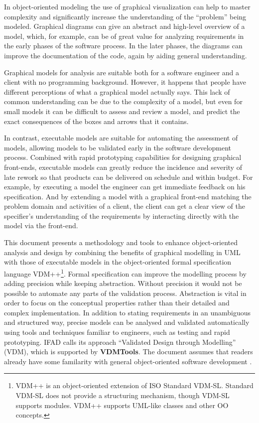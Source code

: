 \documentclass[\pformat,12pt,twoside]{article}
\newcommand{\vdmtools}{\textbf{VDMTools}}
\begin{document}
In object-oriented modeling the use of graphical visualization 
can help to master complexity and significantly increase the 
understanding of the ``problem'' being modeled. Graphical diagrams 
can give an abstract and high-level overview of a model, which, 
for example, can be of great value for analyzing requirements 
in the early phases of the software process. In the later phases, 
the diagrams can improve the documentation of the code, again 
by aiding general understanding.

Graphical models for analysis are suitable both for a software 
engineer and a client with no programming background. However, 
it happens that people have different perceptions of what a graphical 
model actually says. This lack of common understanding can be 
due to the complexity of a model, but even for small models it 
can be difficult to assess and review a model, and predict the 
exact consequences of the boxes and arrows that it contains. 

In contrast, executable models are suitable for automating the 
assessment of models, allowing models to be validated early in 
the software development process. Combined with rapid prototyping 
capabilities for designing graphical front-ends, executable models 
can greatly reduce the incidence and severity of late rework 
so that products can be delivered on schedule and within budget. 
For example, by executing a model the engineer can get immediate 
feedback on his specification. And by extending a model with 
a graphical front-end matching the problem domain and activities 
of a client, the client can get a clear view of the specifier's 
understanding of the requirements by interacting directly with 
the model via the front-end.

This document presents a methodology and tools to enhance
object-oriented analysis and design by combining the benefits of
graphical modelling in UML with those of executable models in the
object-oriented formal specification language VDM++\footnote{{\small
VDM++ is an object-oriented extension of ISO Standard VDM-SL. Standard
VDM-SL does not provide a structuring mechanism, though VDM-SL
supports modules.  VDM++ supports UML-like classes and other OO
concepts}.}.  Formal specification can improve the modelling process by
adding precision while keeping abstraction. Without precision it would
not be possible to automate any parts of the validation
process. Abstraction is vital in order to focus on the conceptual
properties rather than their detailed and complex implementation. In
addition to stating requirements in an unambiguous and structured way,
precise models can be analysed and validated automatically using tools
and techniques familiar to engineers, such as testing and rapid
prototyping. IFAD calls its approach ``Validated Design through
Modelling'' (VDM), which is supported by \vdmtools. The document
assumes that readers already have some familarity with general
object-oriented software development \cite{Meyer88,Shlaer88,Rumbaugh&91}.
\end{document}
